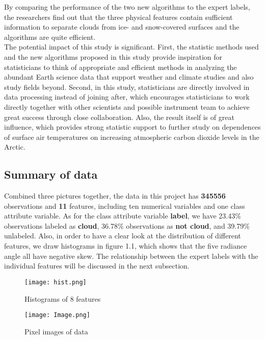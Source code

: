 \documentclass[11pt]{scrartcl} %
\begin{document}
By comparing the performance of the two new algorithms to the expert labels, the researchers find out that the three physical features contain sufficient information to separate clouds from ice- and snow-covered surfaces and the algorithms are quite efficient.\\

The potential impact of this study is significant. First, the statistic methods used and the new algorithms proposed in this study provide inspiration for statisticians to think of appropriate and efficient methods in analyzing the abundant Earth science data that support weather and climate studies and also study fields beyond.  Second, in this study, statisticians are directly involved in data processing instead of joining after, which encourages statisticians to work directly together with other scientists and possible instrument team to achieve great success through close collaboration. Also, the result itself is of great influence, which provides strong statistic support to further study on dependences of surface air temperatures on increasing atmospheric carbon dioxide levels in the Arctic.


\subsection{Summary of data}
Combined three pictures together, the data in this project has \textbf{345556} observations and \textbf{11} features, including ten numerical variables and one class attribute variable. As for the class attribute variable \textbf{label}, we have 23.43\% observations labeled as \textbf{cloud}, 36.78\% observations as \textbf{not cloud}, and 39.79\% unlabeled. Also, in order to have a clear look at the distribution of different features, we draw histograms in figure 1.1, which shows that the five radiance angle all have negative skew. The relationship between the expert labels with the individual features will be discussed in the next subsection.\\

\begin{figure}
	\centering
	\texttt{[image: hist.png]} %
	\caption{Histograms of 8 features}
\end{figure}

\begin{figure}[htb]
	\centering
	\texttt{[image: Image.png]} %
	\caption{Pixel images of data}
\end{figure}
\end{document}

